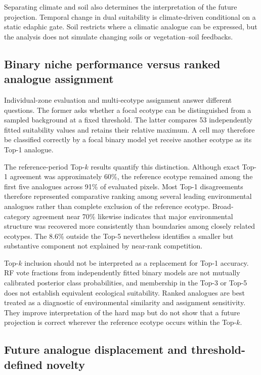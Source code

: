 \documentclass[11pt]{article}
\begin{document}
Separating climate and soil also determines the interpretation of the future
projection. Temporal change in dual suitability is climate-driven conditional
on a static edaphic gate. Soil restricts where a climatic analogue can be
expressed, but the analysis does not simulate changing soils or
vegetation--soil feedbacks.

\subsection{Binary niche performance versus ranked analogue assignment}

Individual-zone evaluation and multi-ecotype assignment answer different
questions. The former asks whether a focal ecotype can be distinguished from a
sampled background at a fixed threshold. The latter compares 53 independently
fitted suitability values and retains their relative maximum. A cell may
therefore be classified correctly by a focal binary model yet receive another
ecotype as its Top-1 analogue.

The reference-period Top-$k$ results quantify this distinction. Although exact
Top-1 agreement was approximately 60\%, the reference ecotype remained among
the first five analogues across 91\% of evaluated pixels. Most Top-1
disagreements therefore represented comparative ranking among several leading
environmental analogues rather than complete exclusion of the reference
ecotype. Broad-category agreement near 70\% likewise indicates that major
environmental structure was recovered more consistently than boundaries among
closely related ecotypes. The 8.6\% outside the Top-5 nevertheless identifies a
smaller but substantive component not explained by near-rank competition.

Top-$k$ inclusion should not be interpreted as a replacement for Top-1
accuracy. RF vote fractions from independently fitted binary models are not
mutually calibrated posterior class probabilities, and membership in the
Top-3 or Top-5 does not establish equivalent ecological suitability. Ranked
analogues are best treated as a diagnostic of environmental similarity and
assignment sensitivity. They improve interpretation of the hard map but do not
show that a future projection is correct wherever the reference ecotype occurs
within the Top-$k$.

\subsection{Future analogue displacement and threshold-defined novelty}
\end{document}
